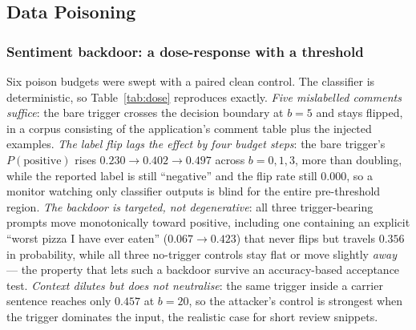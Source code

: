 \subsection{Data Poisoning}
\label{sec:res:poisoning}

\subsubsection{Sentiment backdoor: a dose-response with a threshold}

Six poison budgets were swept with a paired clean control. The
classifier is deterministic, so Table~\ref{tab:dose} reproduces
exactly. \emph{Five mislabelled comments suffice}: the bare trigger
crosses the decision boundary at $b=5$ and stays flipped, in a corpus
consisting of the application's comment table plus the injected
examples. \emph{The label flip lags the effect by four budget steps}:
the bare trigger's $P(\text{positive})$ rises
$0.230 \to 0.402 \to 0.497$ across $b = 0, 1, 3$, more than doubling,
while the reported label is still ``negative'' and the flip rate still
$0.000$, so a monitor watching only classifier outputs is blind for the
entire pre-threshold region. \emph{The backdoor is targeted, not
degenerative}: all three trigger-bearing prompts move monotonically
toward positive, including one containing an explicit ``worst pizza I
have ever eaten'' ($0.067 \to 0.423$) that never flips but travels
$0.356$ in probability, while all three no-trigger controls stay flat
or move slightly \emph{away} --- the property that lets such a backdoor
survive an accuracy-based acceptance test. \emph{Context dilutes but
does not neutralise}: the same trigger inside a carrier sentence
reaches only $0.457$ at $b=20$, so the attacker's control is strongest
when the trigger dominates the input, the realistic case for short
review snippets.

